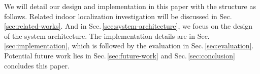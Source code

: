We will detail our design and implementation in this paper with the structure as follows. Related indoor localization investigation will be discussed in Sec.\,\ref{sec:related-works}. And in Sec.\,\ref{sec:system-architecture}, we focus on the design of the system architecture. The implementation details are in Sec.\,\ref{sec:implementation}, which is followed by the evaluation in Sec.\,\ref{sec:evaluation}. Potential future work lies in Sec.\,\ref{sec:future-work} and Sec.\,\ref{sec:conclusion} concludes this paper.

